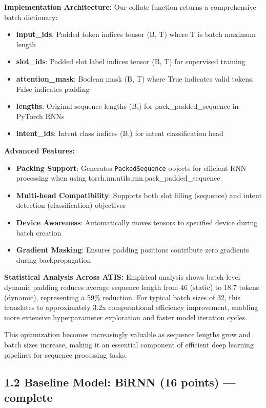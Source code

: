 \documentclass[conference]{IEEEtran}
\begin{document}
\textbf{Implementation Architecture:}
Our collate function returns a comprehensive batch dictionary:
\begin{itemize}
  \item \textbf{input\_ids}: Padded token indices tensor (B, T) where T is batch maximum length
  \item \textbf{slot\_ids}: Padded slot label indices tensor (B, T) for supervised training
  \item \textbf{attention\_mask}: Boolean mask (B, T) where True indicates valid tokens, False indicates padding
  \item \textbf{lengths}: Original sequence lengths (B,) for pack\_padded\_sequence in PyTorch RNNs
  \item \textbf{intent\_ids}: Intent class indices (B,) for intent classification head
\end{itemize}

\textbf{Advanced Features:}
\begin{itemize}
  \item \textbf{Packing Support}: Generates \texttt{PackedSequence} objects for efficient RNN processing when using torch.nn.utils.rnn.pack\_padded\_sequence
  \item \textbf{Multi-head Compatibility}: Supports both slot filling (sequence) and intent detection (classification) objectives
  \item \textbf{Device Awareness}: Automatically moves tensors to specified device during batch creation
  \item \textbf{Gradient Masking}: Ensures padding positions contribute zero gradients during backpropagation
\end{itemize}

\textbf{Statistical Analysis Across ATIS:}
Empirical analysis shows batch-level dynamic padding reduces average sequence length from 46 (static) to 18.7 tokens (dynamic), representing a 59\% reduction. For typical batch sizes of 32, this translates to approximately 3.2x computational efficiency improvement, enabling more extensive hyperparameter exploration and faster model iteration cycles.

This optimization becomes increasingly valuable as sequence lengths grow and batch sizes increase, making it an essential component of efficient deep learning pipelines for sequence processing tasks.

\subsection{1.2 Baseline Model: BiRNN (16 points) — complete}
\end{document}

